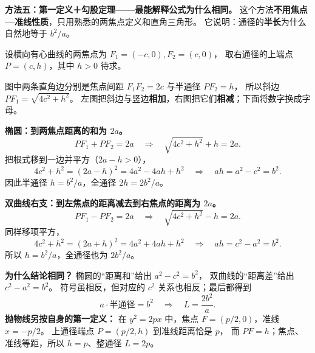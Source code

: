 \begin{proofbox}
\textbf{方法五：第一定义＋勾股定理——最能解释公式为什么相同。}
这个方法\textbf{不用焦点—准线性质}，只用熟悉的两焦点定义和直角三角形。
它说明：通径的\textbf{半长}为什么自然地等于 $b^2/a$。

设横向有心曲线的两焦点为 $F_1=(-c,0),F_2=(c,0)$，
取右通径的上端点 $P=(c,h)$，其中 $h>0$ 待求。

图中两条直角边分别是焦点间距 $F_1F_2=2c$ 与半通径 $PF_2=h$，
所以斜边 $PF_1=\sqrt{4c^2+h^2}$。
左图把斜边与竖边\textbf{相加}，右图把它们\textbf{相减}；下面将数字换成字母。

\textbf{椭圆：到两焦点距离的和为 $2a$。}
\[
 PF_1+PF_2=2a
 \quad\Rightarrow\quad
 \sqrt{4c^2+h^2}+h=2a.
\]
把根式移到一边并平方（$2a-h>0$），
\[
 4c^2+h^2=(2a-h)^2
 =4a^2-4ah+h^2
 \quad\Rightarrow\quad
 ah=a^2-c^2=b^2.
\]
因此半通径 $h=b^2/a$，全通径 $2h=2b^2/a$。

\textbf{双曲线右支：到左焦点的距离减去到右焦点的距离为 $2a$。}
\[
 PF_1-PF_2=2a
 \quad\Rightarrow\quad
 \sqrt{4c^2+h^2}-h=2a.
\]
同样移项平方，
\[
 4c^2+h^2=(2a+h)^2
 =4a^2+4ah+h^2
 \quad\Rightarrow\quad
 ah=c^2-a^2=b^2.
\]
所以 $h=b^2/a$，全通径也为 $2b^2/a$。

\textbf{为什么结论相同？}
椭圆的“距离和”给出 $a^2-c^2=b^2$，
双曲线的“距离差”给出 $c^2-a^2=b^2$。
符号虽相反，但对应的 $c^2$ 关系也相反；最后都得到
\[
 \boxed{a\cdot\text{半通径}=b^2}
 \quad\Longrightarrow\quad
 \boxed{L=\frac{2b^2}{a}}.
\]
\textbf{抛物线另按自身的第一定义：}
在 $y^2=2px$ 中，焦点 $F=(p/2,0)$，准线 $x=-p/2$。
上通径端点 $P=(p/2,h)$ 到准线距离恰是 $p$，
而 $PF=h$；焦点、准线等距，所以 $h=p$、整通径 $L=2p$。
\end{proofbox}
\clearpage
